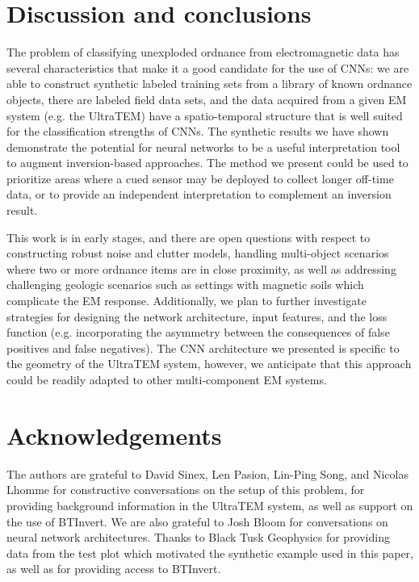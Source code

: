 \documentclass{segabs}
\begin{document}
\vspace{-0.45cm}
\section{Discussion and conclusions}
\vspace{-0.25cm}

The problem of classifying unexploded ordnance from electromagnetic data has several characteristics that make it a good candidate for the use of CNNs: we are able to construct synthetic labeled training sets from a library of known ordnance objects, there are labeled field data sets, and the data acquired from a given EM system (e.g. the UltraTEM) have a spatio-temporal structure that is well suited for the classification strengths of CNNs. The synthetic results we have shown demonstrate the potential for neural networks to be a useful interpretation tool to augment inversion-based approaches. The method we present could be used to prioritize areas where a cued sensor may be deployed to collect longer off-time data, or to provide an independent interpretation to complement an inversion result.

This work is in early stages, and there are open questions with respect to constructing robust noise and clutter models, handling multi-object scenarios where two or more ordnance items are in close proximity, as well as addressing challenging geologic scenarios such as settings with magnetic soils which complicate the EM response. Additionally, we plan to further investigate strategies for designing the network architecture, input features, and the loss function (e.g. incorporating the asymmetry between the consequences of false positives and false negatives). The CNN architecture we presented is specific to the geometry of the UltraTEM system, however, we anticipate that this approach could be readily adapted to other multi-component EM systems.

\vspace{-0.45cm}
\section{Acknowledgements}
\vspace{-0.25cm}

The authors are grateful to David Sinex, Len Pasion, Lin-Ping Song, and Nicolas Lhomme for constructive conversations on the setup of this problem, for providing background information in the UltraTEM system, as well as support on the use of BTInvert. We are also grateful to Josh Bloom for conversations on neural network architectures.
Thanks to Black Tusk Geophysics for providing data from the test plot which motivated the synthetic example used in this paper, as well as for providing access to BTInvert.

\onecolumn



\end{document}
